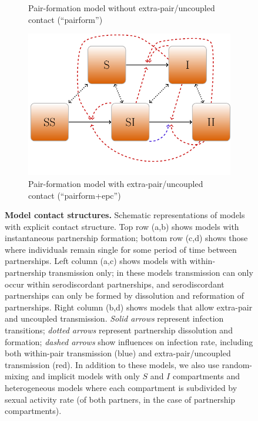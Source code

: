 \documentclass[10pt,letterpaper]{article}
\begin{document}
\begin{figure}[t!p]
\begin{subfigure}[b]{0.4\linewidth}
	\centering
\caption{Pair-formation model without extra-pair/uncoupled contact 
(``pairform'')}
\end{subfigure}
\begin{subfigure}[b]{0.4\linewidth}
	\centering
	  \includegraphics[width=0.9\linewidth]{../figures/tikz-f4}
\caption{Pair-formation model with extra-pair/uncoupled contact
(``pairform+epc'')}
\end{subfigure}

\caption{\textbf{Model contact structures.} 
Schematic representations of models with
explicit contact structure. Top row (a,b) shows models with instantaneous
partnership formation; bottom row (c,d)  shows those where individuals remain
single for some period of time between partnerships. Left column (a,c) 
shows models with within-partnership transmission only; in these models
transmission can only occur within serodiscordant partnerships, and
serodiscordant partnerships can only be formed by dissolution
and reformation of partnerships. Right column (b,d) shows models
that allow extra-pair and uncoupled transmission.
\emph{Solid arrows} represent infection transitions; \emph{dotted arrows}
represent partnership dissolution and formation; \emph{dashed arrows}
show influences on infection rate, including both within-pair
transmission (blue) and extra-pair/uncoupled transmission (red).
In addition to these models, we also use random-mixing and implicit
models with only $S$ and $I$ compartments and heterogeneous models
where each compartment is subdivided by sexual activity rate
(of both partners, in the case of partnership compartments).
}
\label{fig:diagrams}
\end{figure}
\end{document}
